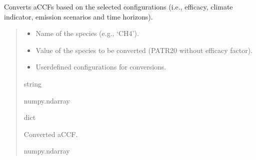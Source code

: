 \documentclass[a4paper,11pt,english]{sphinxmanual}
\begin{document}
\begin{fulllineitems}
\label{\detokenize{modules:envlib.accf.convert_accf}}
\pysigstartsignatures
{}
\pysigstopsignatures
\sphinxAtStartPar
Converts aCCFs based on the selected configurations (i.e., efficacy, climate indicator, emission scenarios and time horizons).
\begin{quote}\begin{description}
\begin{itemize}
\item {} 
\sphinxAtStartPar
{} \textendash{} Name of the species (e.g., ‘CH4’).

\item {} 
\sphinxAtStartPar
{} \textendash{} Value of the species to be converted (P\sphinxhyphen{}ATR20 without efficacy factor).

\item {} 
\sphinxAtStartPar
{} \textendash{} User\sphinxhyphen{}defined configurations for conversions.

\end{itemize}

\sphinxAtStartPar
string

\sphinxAtStartPar
numpy.ndarray

\sphinxAtStartPar
dict

\sphinxAtStartPar
Converted aCCF.

\sphinxAtStartPar
numpy.ndarray

\end{description}\end{quote}

\end{fulllineitems}

\end{document}
